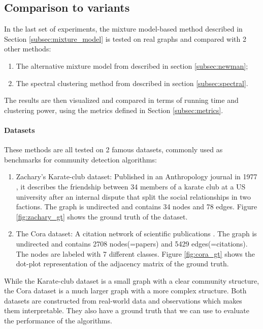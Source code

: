 \documentclass[switch, 12pt]{article}
\begin{document}
\begin{multicols}{2}
    \subsection{Comparison to variants}

    In the last set of experiments, the mixture model-based method \cite{main_article} described in Section \ref{subsec:mixture_model} is tested on real graphs and compared with 2 other methods:
    \begin{enumerate}
        \item The alternative mixture model from \cite{newman} described in section \ref{subsec:newman};
        \item The spectral clustering method from \cite{spectral} described in section \ref{subsec:spectral}.
    \end{enumerate}

    The results are then visualized and compared in terms of running time and clustering power, using the metrics defined in Section \ref{subsec:metrics}.
    \paragraph{Datasets}
    These methods are all tested on 2 famous datasets, commonly used as benchmarks for community detection algorithms:
    \begin{enumerate}
        \item Zachary's Karate-club dataset: Published in an Anthropology journal in 1977 \cite{karate}, it describes the friendship between 34 members of a karate club at a US university after an internal dispute that split the social relationships in two factions. The graph is undirected and contains 34 nodes and 78 edges. Figure \ref{fig:zachary_gt} shows the ground truth of the dataset.
        \item The Cora dataset: A citation network of scientific publications \cite{cora}. The graph is undirected and contains 2708 nodes(=papers) and 5429 edges(=citations). The nodes are labeled with 7 different classes. Figure \ref{fig:cora_gt} shows the dot-plot representation of the adjacency matrix of the ground truth.
    \end{enumerate}
    While the Karate-club dataset is a small graph with a clear community structure, the Cora dataset is a much larger graph with a more complex structure. Both datasets are constructed from real-world data and observations which makes them interpretable. They also have a ground truth that we can use to evaluate the performance of the algorithms.

\end{multicols}
\end{document}
